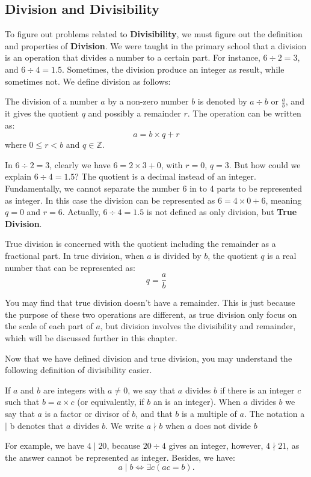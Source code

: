 \subsection{Division and Divisibility}
To figure out problems related to \textbf{Divisibility}, we must figure out the definition and properties
of \textbf{Division}. We were taught in the primary school that a division is an operation  that
divides a number to a certain part. For instance, $6\div2=3$, and $6\div4=1.5$. Sometimes, the
division produce an integer as result, while sometimes not. We define division as follows:
    \begin{definition}[Division]
        The division of a number \( a \) by a non-zero number \( b \) is denoted by \( a \div b \) or \( \frac{a}{b} \), and it gives the quotient \( q \) and possibly a remainder \( r \). The operation can be written as:
        \[
        a = b \times q + r
        \]
        where \( 0 \leq r < b \) and \(q \in \mathbb{Z}\).
    \end{definition}
    In $6\div2=3$, clearly we have $6=2\times3+0$, with $r=0$, $q=3$. But how could we explain
    $6\div4=1.5$? The quotient is a decimal instead of an integer. Fundamentally, we cannot separate
    the number 6 in to 4 parts to be represented as integer. In this case the division can be represented
    as $6 = 4\times0+6$, meaning $q=0$ and $r=6$. Actually, $6\div4=1.5$ is not defined as only
    division, but \textbf{True Division}.
    \begin{definition}
        True division is concerned with the quotient including the remainder as a fractional part. In true division, when \( a \) is divided by \( b \), the quotient \( q \) is a real number that can be represented as:
        \[
        q = \frac{a}{b}
        \]
    \end{definition}
    You may find that true division doesn't have a remainder. This is just because the purpose of 
    these two operations are different, as true division only focus on the scale of each part of
    $a$, but division involves the divisibility and remainder, which will be discussed further
    in this chapter.

    Now that we have defined division and true division, you may understand the following definition
    of divisibility easier.
    \begin{definition}[Divisibility]
        If $a$ and $b$ are integers with $a \neq 0$, we say that $a$ divides $b$ if there is an integer $c$ such that $b = a\times c$ (or equivalently, if $b$ an is an integer). When $a$ divides $b$ we say that $a$ is a factor or divisor of $b$, and that $b$ is a multiple of $a$. The notation a $\mid$ b denotes that $a$ divides $b$. We write $a \nmid b$ when $a$ does not divide $b$
    \end{definition}
    For example, we have $4\mid 20$, because $20\div4$ gives an integer, however, $4\nmid 21$, as the answer
    cannot be represented as integer. Besides, we have:
    \begin{equation}
        a\mid b \iff \exists c(ac=b).
    \end{equation}

